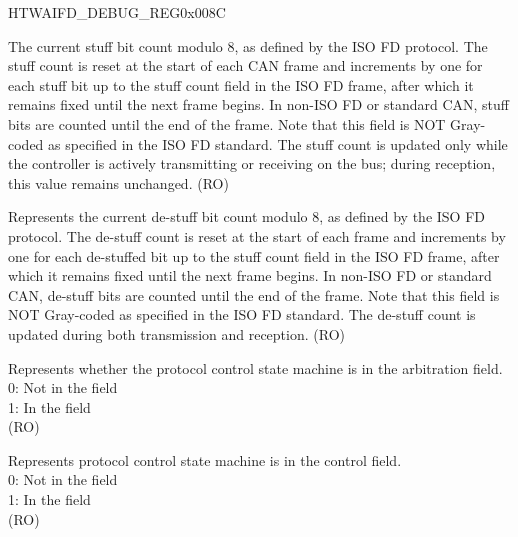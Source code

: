 \begin{register}{H}{TWAIFD\_DEBUG\_REG}{0x008C}\label{regdesc:TWAIFDDEBUGREG}
%
%
%
%
%
%
%
%
%
%
%
%
%
%
%
%
\regnewline%
\begin{regdesc}\begin{reglist}
\label{fielddesc:TWAIFDSTUFFCOUNT}\item [TWAIFD\_STUFF\_COUNT] The current stuff bit count modulo 8, as defined by the ISO FD protocol. The stuff count is reset at the start of each CAN frame and increments by one for each stuff bit up to the stuff count field in the ISO FD frame, after which it remains fixed until the next frame begins. In non-ISO FD or standard CAN, stuff bits are counted until the end of the frame. Note that this field is NOT Gray-coded as specified in the ISO FD standard. The stuff count is updated only while the controller is actively transmitting or receiving on the bus; during reception, this value remains unchanged. (RO)
\label{fielddesc:TWAIFDDESTUFFCOUNT}\item [TWAIFD\_DESTUFF\_COUNT] Represents the current de-stuff bit count modulo 8, as defined by the ISO FD protocol. The de-stuff count is reset at the start of each frame and increments by one for each de-stuffed bit up to the stuff count field in the ISO FD frame, after which it remains fixed until the next frame begins. In non-ISO FD or standard CAN, de-stuff bits are counted until the end of the frame. Note that this field is NOT Gray-coded as specified in the ISO FD standard. The de-stuff count is updated during both transmission and reception. (RO)
\label{fielddesc:TWAIFDPCARB}\item [TWAIFD\_PC\_ARB] Represents whether the protocol control state machine is in the arbitration field.\\0: Not in the field\\1: In the field\\(RO)
\label{fielddesc:TWAIFDPCCON}\item [TWAIFD\_PC\_CON] Represents protocol control state machine is in the control field.\\0: Not in the field\\1: In the field\\(RO)

\end{reglist}
\end{regdesc}
\end{register}

